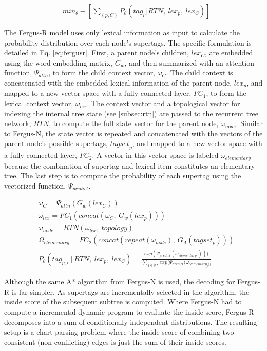\documentclass[11pt]{article}
\begin{document}
\begin{align}
&min_{\theta} -[\sum_{(p,C)} P_\theta(tag_{p}|RTN,~lex_p,~lex_{C})] \label{eq:rtnobj}
\end{align}

The Fergus-R model uses only lexical information as input to calculate the probability distribution over each node's supertags. 
%
The specific formulation is detailed in Eq. \ref{eq:fergusr}.
%
First, a parent node's children, $lex_C$, are embedded using the word embedding matrix, $G_w$, and then summarized with an attention function, $\Psi_{attn}$, to form the child context vector, $\omega_{C}$. 
%
The child context is concatenated with the embedded lexical information of the parent node, $lex_p$, and mapped to a new vector space with a fully connected layer, $FC_1$, to form the lexical context vector, $\omega_{lex}$.
%
The context vector and a topological vector for indexing the internal tree state (see \ref{subsec:rtn}) are passed to the recurrent tree network, $RTN$, to compute the full state vector for the parent node, $\omega_{node}$.
%
Similar to Fergus-N, the state vector is repeated and concatenated with the vectors of the parent node's possible supertags, ${tagset}_p$, and mapped to a new vector space with a fully connected layer, $FC_2$.
%
A vector in this vector space is labeled $\omega_{elementary}$ because the combination of supertag and lexical item constitutes an elementary tree.
%
The last step is to compute the probability of each supertag using the vectorized function, $\Psi_{predict}$.


\begin{align}
&\omega_{C} = \Psi_{attn}(G_w(lex_C)) \label{eq:fergusr} \\
&\omega_{lex} = FC_1(concat(\omega_{C},~G_w(lex_p))) \nonumber \\
&\omega_{node} = RTN(\omega_{lex},~topology) \nonumber \\
&\Omega_{elementary} = FC_2(concat(repeat(\omega_{node}),~G_\Lambda(tagset_p))) \nonumber \\
&P_\theta(tag_{p,i}~|~RTN,~lex_p,~lex_{C}) = 
\frac{exp(\Psi_{predict}(\omega_{elementary_i})))}
{\sum_{j \in |\Omega|} exp(\Psi_{predict}(\omega_{elementary_j))}} \nonumber
\end{align}

Although the same A* algorithm from Fergus-N is used, the decoding for Fergus-R is far simpler.
%
As supertags are incrementally selected in the algorithm, the inside score of the subsequent subtree is computed.  
%
Where Fergus-N had to compute a incremental dynamic program to evaluate the inside score, Fergus-R decomposes into a sum of conditionally independent distributions. 
%
The resulting setup is a chart parsing problem where the inside score of combining two consistent (non-conflicting) edges is just the sum of their inside scores. 
\end{document}
